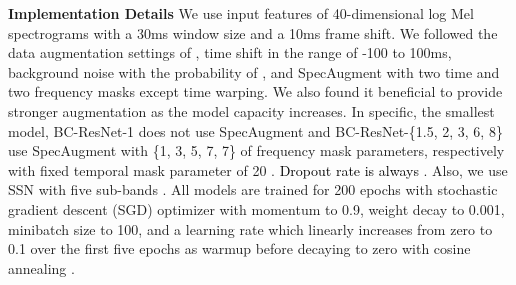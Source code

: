 \documentclass[a4paper]{article}
\newcommand\bg[1]{\textcolor{blue}{#1}}
\renewcommand\bg[1]{\textcolor{black}{#1}}
\begin{document}
\noindent \textbf{Implementation Details} We use input features of 40-dimensional log Mel spectrograms with a 30ms window size and a 10ms frame shift. We followed the data augmentation settings of \cite{res15}, time shift in the range of -100 to 100ms, background noise \cite{speechdataset} with the probability of , and SpecAugment \cite{specaugment} with two time and two frequency masks except time warping. We also found it beneficial to provide stronger augmentation as the model capacity increases. In specific, the smallest model, BC-ResNet-1 does not use SpecAugment and BC-ResNet-\{1.5, 2, 3, 6, 8\} use SpecAugment with \{1, 3, 5, 7, 7\} of frequency mask parameters, respectively with fixed temporal mask parameter of 20 \cite{specaugment}. \bg{Dropout rate is always }. Also, we use SSN with five sub-bands \cite{ssn}. 
All models are trained for 200 epochs with stochastic gradient descent (SGD) optimizer with momentum to 0.9, weight decay to 0.001, minibatch size to 100, and a learning rate which linearly increases from zero to 0.1 over the first five epochs as warmup \cite{warmup} before decaying to zero with cosine annealing \cite{cosine_schedule}.

\begin{table}[t]
    \caption{\textbf{Impact of Broadcasted Residual Learning and Ablation Study.} We demonstrate how each component affects the base model, BC-ResNet-1, on Google speech command datasets v1 and v2. We show mean and standard deviation of Top-1 test accuracy (\%).  (averaged over 5 seeds).}
    \label{abalation_table}
    \centering
    \vskip -0.1in
\end{table}
\end{document}
